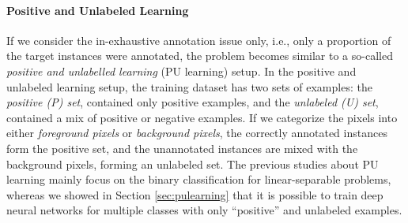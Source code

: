 \paragraph{Positive and Unlabeled Learning}
If we consider the in-exhaustive annotation issue only, i.e., only a proportion of the target instances were annotated, the problem becomes similar to a so-called \textit{positive and unlabelled learning} (PU learning) setup\cite{li2005learning}.
In the positive and unlabeled learning setup, the training dataset has two sets of examples: the \textit{positive (P) set}, contained only positive examples, and the \textit{unlabeled (U) set}, contained a mix of positive or negative examples.
If we categorize the pixels into either \textit{foreground pixels} or \textit{background pixels}, the correctly annotated instances form the positive set, and the unannotated instances are mixed with the background pixels, forming an unlabeled set.
The previous studies about PU learning mainly focus on the binary classification for linear-separable problems\cite{elkan2008learning,lee2003learning},  whereas we showed in Section \ref{sec:pulearning} that it is possible to train deep neural networks for multiple classes with only ``positive'' and unlabeled examples.
